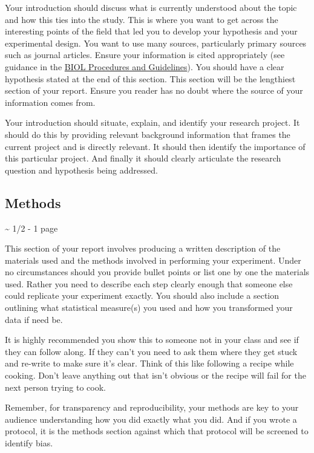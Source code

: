 \documentclass[
]{book}
\begin{document}
Your introduction should discuss what is currently understood about the topic and how this ties into the study. This is where you want to get across the interesting points of the field that led you to develop your hypothesis and your experimental design. You want to use many sources, particularly primary sources such as journal articles. Ensure your information is cited appropriately (see guidance in the \href{https://ubco-biology.github.io/Procedures-and-Guidelines/apa-citations.html}{BIOL Procedures and Guidelines}). You should have a clear hypothesis stated at the end of this section. This section will be the lengthiest section of your report. Ensure you reader has no doubt where the source of your information comes from.

Your introduction should situate, explain, and identify your research project. It should do this by providing relevant background information that frames the current project and is directly relevant. It should then identify the importance of this particular project. And finally it should clearly articulate the research question and hypothesis being addressed.

\hypertarget{methods}{%
\subsection*{Methods}\label{methods}}

\textasciitilde{} 1/2 - 1 page

This section of your report involves producing a written description of the materials used and the methods involved in performing your experiment. Under no circumstances should you provide bullet points or list one by one the materials used. Rather you need to describe each step clearly enough that someone else could replicate your experiment exactly. You should also include a section outlining what statistical measure(s) you used and how you transformed your data if need be.

It is highly recommended you show this to someone not in your class and see if they can follow along. If they can't you need to ask them where they get stuck and re-write to make sure it's clear. Think of this like following a recipe while cooking. Don't leave anything out that isn't obvious or the recipe will fail for the next person trying to cook.

Remember, for transparency and reproducibility, your methods are key to your audience understanding how you did exactly what you did. And if you wrote a protocol, it is the methods section against which that protocol will be screened to identify bias.
\end{document}
